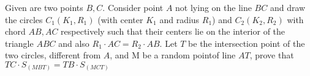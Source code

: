Given are two points $B,C$. Consider point $A$ not lying on the line $BC$ and draw the circles $C_1(K_1,R_1)$ (with center $K_1$ and radius $R_1$) and $C_2(K_2,R_2)$ with chord $AB, AC$ respectively such that their centers lie on the interior of the triangle $ABC$ and also $R_1 \cdot AC= R_2 \cdot AB$. Let $T$ be the intersection point of the two circles, different from $A$, and M be a random pointof line $AT$, prove that $TC \cdot S_{(MBT)}=TB \cdot S_{(MCT)}$
